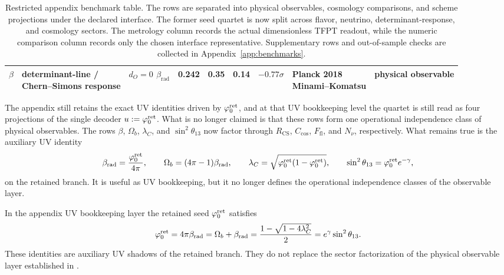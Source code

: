 \begin{table}[t]
{\begin{tabular}{@{}lllrrrrll@{}}
$\beta$ & \makecell[l]{determinant-line /\\Chern--Simons response} & \makecell[l]{$d_O=0$\\$\beta_{\mathrm{rad}}$} & \num{0.242} & \num{0.35} & \num{0.14} & $-0.77\sigma$ & \makecell[l]{Planck 2018\\Minami--Komatsu} & physical observable \\
\bottomrule
\end{tabular}}
\caption{Restricted appendix benchmark table. The rows are separated into physical observables,
cosmology comparisons, and scheme projections under the declared interface. The former seed quartet
is now split across flavor, neutrino, determinant-response, and cosmology sectors. The metrology
column records the actual dimensionless TFPT readout, while the numeric comparison column records
only the chosen interface representative. Supplementary rows and out-of-sample checks are collected
in Appendix~\ref{app:benchmarks}.}
\label{tab:benchmark}
\end{table}

\begin{remark}
The appendix still retains the exact UV identities driven by $\varphi_0^{\mathrm{ret}}$, and at that UV bookkeeping
level the quartet is still read as four projections of the single decoder $u:=\varphi_0^{\mathrm{ret}}$. What is no
longer claimed is that these rows form one operational independence class of physical observables.
The rows $\beta$, $\Omega_b$, $\lambda_C$, and $\sin^2\theta_{13}$ now factor through
$R_{\mathrm{CS}}$, $C_{\mathrm{cos}}$, $F_{\mathrm{fl}}$, and $N_\nu$, respectively. What remains
true is the auxiliary UV identity
\[
\beta_{\mathrm{rad}}=\frac{\varphi_0^{\mathrm{ret}}}{4\pi},
\qquad
\Omega_b=(4\pi-1)\beta_{\mathrm{rad}},
\qquad
\lambda_C=\sqrt{\varphi_0^{\mathrm{ret}}(1-\varphi_0^{\mathrm{ret}})},
\qquad
\sin^2\theta_{13}=\varphi_0^{\mathrm{ret}} e^{-\gamma},
\]
on the retained branch. It is useful as UV bookkeeping, but it no longer defines the operational
independence classes of the observable layer.
\end{remark}

\begin{corollary}
\label{cor:retained-seed-factorization}
In the appendix UV bookkeeping layer the retained seed $\varphi_0^{\mathrm{ret}}$ satisfies
\[
\varphi_0^{\mathrm{ret}}
=
4\pi\beta_{\mathrm{rad}}
=
\Omega_b+\beta_{\mathrm{rad}}
=
\frac{1-\sqrt{1-4\lambda_C^2}}{2}
=
e^{\gamma}\sin^2\theta_{13}.
\]
These identities are auxiliary UV shadows of the retained branch. They do not replace the sector
factorization of the physical observable layer established in
.
\end{corollary}

